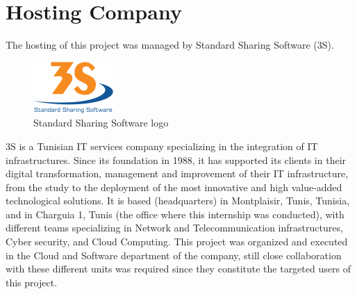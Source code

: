 \section{Hosting Company}
The hosting of this project was managed by Standard Sharing Software (3S).
\smallskip\newline
\begin{figure}[htbp]
    \centering
    \includegraphics[width=0.4\linewidth]{./figures/logo_3S.png}
    \caption{Standard Sharing Software logo}
\end{figure}\newline
3S is a Tunisian IT services company specializing in the integration of IT infrastructures. Since its foundation in 1988, it has supported its clients in their digital transformation, management and improvement of their IT infrastructure, from the study to the deployment of the most innovative and high value-added technological solutions.
It is based (headquarters) in Montplaisir, Tunis, Tunisia, and in Charguia 1, Tunis (the office where this internship was conducted), with different teams specializing in Network and Telecommunication infrastructures, Cyber security, and Cloud Computing. This project was organized and executed in the Cloud and Software department of the company, still close collaboration with these different units was required since they constitute the targeted users of this project.
\newpage

